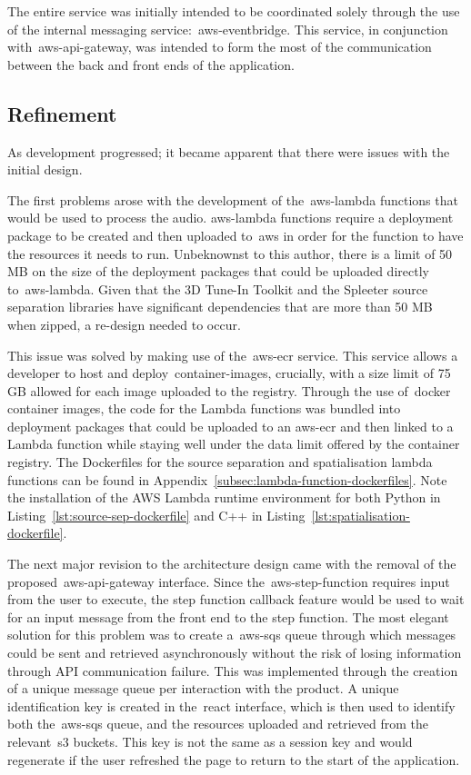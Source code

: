 The entire service was initially intended
to be coordinated solely through the use of the internal messaging service:~\gls{aws-eventbridge}.
This service, in conjunction with~\gls{aws-api-gateway},
was intended to form the most of the communication between the back and front ends of the application.

\subsection{Refinement}\label{subsec:refinement}

As development progressed; it became apparent that there were issues with the initial design.

The first problems arose with the development of the~\gls{aws-lambda} functions that would be used to process the audio.
\gls{aws-lambda} functions
require a deployment package to be created
and then uploaded to~\gls{aws} in order for the function to have the resources it needs to run.
Unbeknownst to this author,
there is a limit of 50 MB on the size of the deployment packages that could be uploaded directly to~\gls{aws-lambda}.
Given that the 3D Tune-In Toolkit and the Spleeter source separation libraries have significant dependencies
that are more than 50 MB when zipped, a re-design needed to occur.

This issue was solved by making use of the~\gls{aws-ecr} service.
This service allows a developer to host and deploy~\glspl{container-image},
crucially, with a size limit of 75 GB allowed for each image uploaded to the registry.
Through the use of~\gls{docker} container images,
the code for the Lambda functions was bundled into deployment packages
that could be uploaded to an
\gls{aws-ecr} and then linked to a Lambda function
while staying well under the data limit offered by the container registry.
The Dockerfiles for the source separation and spatialisation lambda functions can be found in Appendix~\ref{subsec:lambda-function-dockerfiles}.
Note the installation of the AWS Lambda runtime environment for both Python in Listing~\ref{lst:source-sep-dockerfile} and C++ in Listing~\ref{lst:spatialisation-dockerfile}.

The next major revision to the architecture design came with the removal of the proposed~\gls{aws-api-gateway} interface.
Since the~\gls{aws-step-function} requires input from the user to execute,
the step function callback feature would be used to wait for an input message from the front end to the step function.
The most elegant solution for this problem was
to create a~\gls{aws-sqs} queue through which messages could be sent
and retrieved asynchronously without the risk of losing information through API communication failure.
This was implemented through the creation of a unique message queue per interaction with the product.
A unique identification key is created in the~\gls{react} interface, which is then used
to identify both the~\gls{aws-sqs} queue, and the resources uploaded and retrieved from the relevant~\gls{s3} buckets.
This key is not the same as a session key and would regenerate if the user refreshed the page to return to the start of the application.

